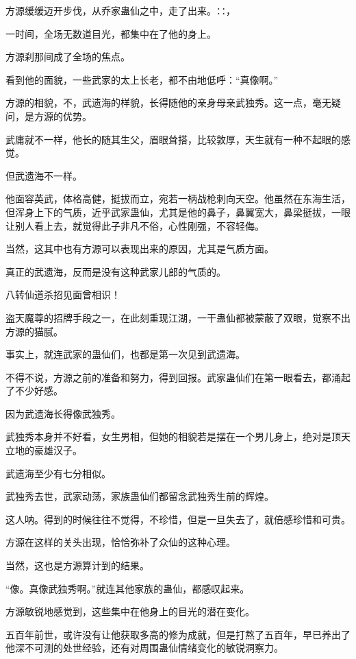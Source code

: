 
\begin{this_body}

方源缓缓迈开步伐，从乔家蛊仙之中，走了出来。∷，

一时间，全场无数道目光，都集中在了他的身上。

方源刹那间成了全场的焦点。

看到他的面貌，一些武家的太上长老，都不由地低呼：“真像啊。”

方源的相貌，不，武遗海的样貌，长得随他的亲身母亲武独秀。这一点，毫无疑问，是方源的优势。

武庸就不一样，他长的随其生父，眉眼耸搭，比较敦厚，天生就有一种不起眼的感觉。

但武遗海不一样。

他面容英武，体格高健，挺拔而立，宛若一柄战枪刺向天空。他虽然在东海生活，但浑身上下的气质，近乎武家蛊仙，尤其是他的鼻子，鼻翼宽大，鼻梁挺拔，一眼让别人看上去，就觉得此子非凡不俗，心性刚强，不容轻侮。

当然，这其中也有方源可以表现出来的原因，尤其是气质方面。

真正的武遗海，反而是没有这种武家儿郎的气质的。

八转仙道杀招见面曾相识！

盗天魔尊的招牌手段之一，在此刻重现江湖，一干蛊仙都被蒙蔽了双眼，觉察不出方源的猫腻。

事实上，就连武家的蛊仙们，也都是第一次见到武遗海。

不得不说，方源之前的准备和努力，得到回报。武家蛊仙们在第一眼看去，都涌起了不少好感。

因为武遗海长得像武独秀。

武独秀本身并不好看，女生男相，但她的相貌若是摆在一个男儿身上，绝对是顶天立地的豪雄汉子。

武遗海至少有七分相似。

武独秀去世，武家动荡，家族蛊仙们都留念武独秀生前的辉煌。

这人呐。得到的时候往往不觉得，不珍惜，但是一旦失去了，就倍感珍惜和可贵。

方源在这样的关头出现，恰恰弥补了众仙的这种心理。

当然，这也是方源算计到的结果。

“像。真像武独秀啊。”就连其他家族的蛊仙，都感叹起来。

方源敏锐地感觉到，这些集中在他身上的目光的潜在变化。

五百年前世，或许没有让他获取多高的修为成就，但是打熬了五百年，早已养出了他深不可测的处世经验，还有对周围蛊仙情绪变化的敏锐洞察力。


\end{this_body}
